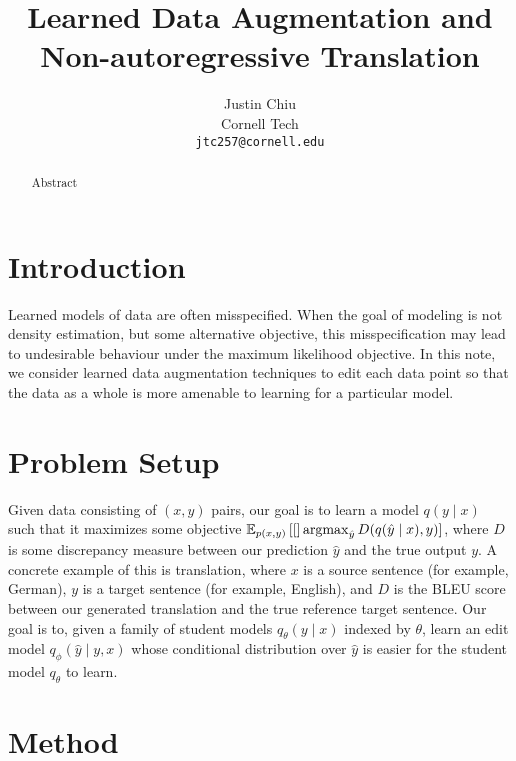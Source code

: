 \documentclass[11pt]{article}
\title{Learned Data Augmentation and Non-autoregressive Translation}
\author{Justin Chiu \\
  Cornell Tech \\
  \texttt{jtc257@cornell.edu}}
\begin{document}
\maketitle
\begin{abstract}
Abstract
\end{abstract}

\section{Introduction}
Learned models of data are often misspecified.
When the goal of modeling is not density estimation,
but some alternative objective, this misspecification may lead to undesirable
behaviour under the maximum likelihood objective.
In this note, we consider learned data augmentation techniques to edit
each data point so that the data as a whole is more amenable to learning for a particular model.

\section{Problem Setup}
Given data consisting of $(x,y)$ pairs, our goal is to learn a model $q(y \mid x)$
such that it maximizes some objective $\mathbb{E}_{p(x,y)}\left[[\right]\operatorname*{argmax}_{\hat{y}}D(q(\hat{y} \mid x), y)]$,
where $D$ is some discrepancy measure between our prediction $\hat{y}$ and the true output $y$.
A concrete example of this is translation, where $x$ is a source sentence (for example, German),
$y$ is a target sentence (for example, English),
and $D$ is the BLEU score between our generated translation and the true
reference target sentence.
Our goal is to, given a family of student models $q_\theta(y \mid x)$ indexed by $\theta$,
learn an edit model $q_\phi(\hat{y} \mid y, x)$ whose conditional distribution over $\hat{y}$
is easier for the student model $q_\theta$ to learn.

\section{Method}



\end{document}

